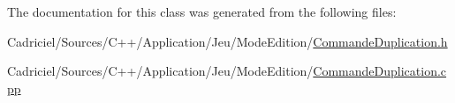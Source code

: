 The documentation for this class was generated from the following files\-:\begin{DoxyCompactItemize}
\item 
Cadriciel/\-Sources/\-C++/\-Application/\-Jeu/\-Mode\-Edition/\hyperlink{_commande_duplication_8h}{Commande\-Duplication.\-h}\item 
Cadriciel/\-Sources/\-C++/\-Application/\-Jeu/\-Mode\-Edition/\hyperlink{_commande_duplication_8cpp}{Commande\-Duplication.\-cpp}\end{DoxyCompactItemize}
